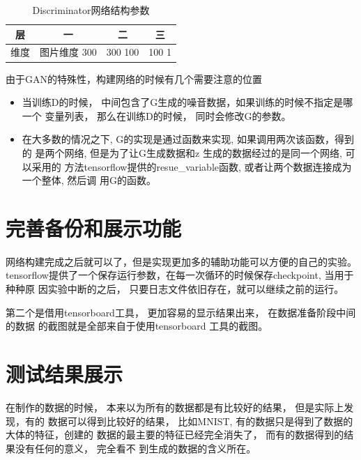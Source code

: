 \begin{table}[htb]
\centering
\label{lab_table_2}
\begin{tabular}{c|c|c|c}
\hline\hline

\textbf{层} & \textbf{一} & \textbf{二} & \textbf{三} \\
\hline\hline
维度    & 图片维度  300 & 300 100  & 100 1\\
\hline
\hline\hline
\end{tabular}
\caption{Discriminator网络结构参数}
\end{table}

由于GAN的特殊性，构建网络的时候有几个需要注意的位置


\begin{itemize}
  \item 当训练D的时候， 中间包含了G生成的噪音数据，如果训练的时候不指定是哪一个
  变量列表， 那么在训练D的时候， 同时会修改G的参数。

  \item 在大多数的情况之下, G的实现是通过函数来实现, 如果调用两次该函数，得到的
  是两个网络, 但是为了让G生成数据和z 生成的数据经过的是同一个网络, 可以采用的
  方法tensorflow提供的resue\_variable函数, 或者让两个数据连接成为一个整体, 然后调
  用G的函数。
\end{itemize}



\section{完善备份和展示功能}
网络构建完成之后就可以了，但是实现更加多的辅助功能可以方便的自己的实验。\\
tensorflow提供了一个保存运行参数，在每一次循环的时候保存checkpoint, 当用于种种原
因实验中断的之后， 只要日志文件依旧存在，就可以继续之前的运行。

第二个是借用tensorboard工具， 更加容易的显示结果出来， 在数据准备阶段中间的数据
的截图就是全部来自于使用tensorboard 工具的截图。

\section{测试结果展示}
在制作的数据的时候， 本来以为所有的数据都是有比较好的结果， 但是实际上发现，有的
数据可以得到比较好的结果， 比如MNIST, 有的数据只是得到了数据的大体的特征，创建的
数据的最主要的特征已经完全消失了， 而有的数据得到的结果没有任何的意义， 完全看不
到生成的数据的含义所在。


